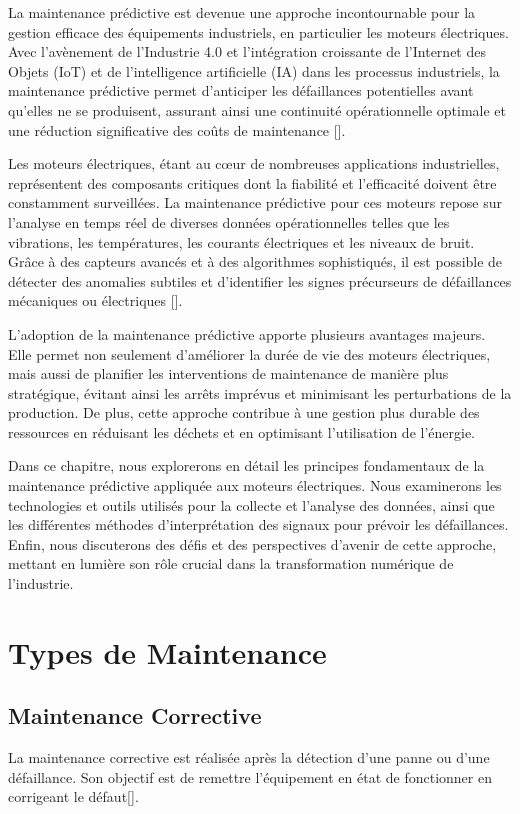 La maintenance prédictive est devenue une approche incontournable pour la
gestion efficace des équipements industriels, en particulier les moteurs
électriques. Avec l'avènement de l'Industrie 4.0 et l'intégration croissante de
l'Internet des Objets (IoT) et de l'intelligence artificielle (IA) dans les
processus industriels, la maintenance prédictive permet d'anticiper les
défaillances potentielles avant qu'elles ne se produisent, assurant ainsi une
continuité opérationnelle optimale et une réduction significative des coûts de
maintenance [\cite{Mrozek2023}].

Les moteurs électriques, étant au cœur de nombreuses applications
industrielles, représentent des composants critiques dont la fiabilité et
l'efficacité doivent être constamment surveillées. La maintenance prédictive
pour ces moteurs repose sur l'analyse en temps réel de diverses données
opérationnelles telles que les vibrations, les températures, les courants
électriques et les niveaux de bruit. Grâce à des capteurs avancés et à des
algorithmes sophistiqués, il est possible de détecter des anomalies subtiles et
d'identifier les signes précurseurs de défaillances mécaniques ou électriques
[\cite{Bentivogli2023}].

L'adoption de la maintenance prédictive apporte plusieurs avantages majeurs.
Elle permet non seulement d'améliorer la durée de vie des moteurs électriques,
mais aussi de planifier les interventions de maintenance de manière plus
stratégique, évitant ainsi les arrêts imprévus et minimisant les perturbations
de la production. De plus, cette approche contribue à une gestion plus durable
des ressources en réduisant les déchets et en optimisant l'utilisation de
l'énergie.

Dans ce chapitre, nous explorerons en détail les principes fondamentaux de la
maintenance prédictive appliquée aux moteurs électriques. Nous examinerons les
technologies et outils utilisés pour la collecte et l'analyse des données,
ainsi que les différentes méthodes d'interprétation des signaux pour prévoir
les défaillances. Enfin, nous discuterons des défis et des perspectives
d'avenir de cette approche, mettant en lumière son rôle crucial dans la
transformation numérique de l'industrie.

\section{Types de Maintenance}

\subsection{Maintenance Corrective}
La maintenance corrective est réalisée après la détection d’une panne ou d’une
défaillance. Son objectif est de remettre l’équipement en état de fonctionner
en corrigeant le défaut[\cite{Sezdi2019}].

